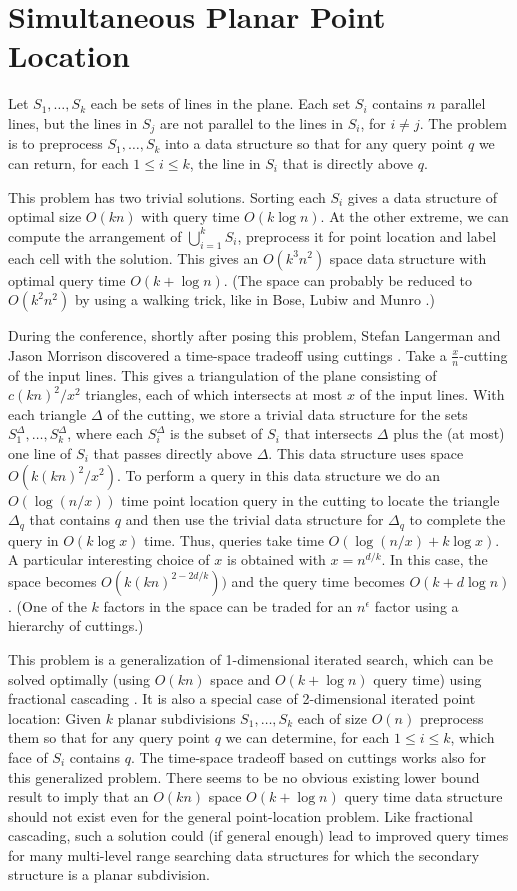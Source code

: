 \documentclass{article}
\newcommand{\problem}[1]{\section*{#1}}
\begin{document}
\problem{Simultaneous Planar Point Location}

Let $S_1,\ldots,S_k$ each be sets of lines in the plane.  Each set
$S_i$ contains $n$ parallel lines, but the lines in $S_j$ are not
parallel to the lines in $S_i$, for $i\neq j$.  The problem is to
preprocess $S_1,\ldots,S_k$ into a data structure so that for any
query point $q$ we can return, for each $1\le i\le k$, the line in
$S_i$ that is directly above $q$. 

This problem has two trivial solutions.  Sorting each $S_i$ gives a
data structure of optimal size $O(kn)$ with query time $O(k\log n)$.
At the other extreme, we can compute the arrangement of
$\bigcup_{i=1}^k S_i$, preprocess it for point location and label each
cell with the solution.  This gives an $O(k^3n^2)$ space data
structure with optimal query time $O(k + \log n)$.  (The space can
probably be reduced to $O(k^2n^2)$ by using a walking trick, like in
Bose, Lubiw and Munro \cite{blm02}.)

During the conference, shortly after posing this problem, Stefan
Langerman and Jason Morrison discovered a time-space tradeoff using
cuttings \cite{m98}. Take a $\frac{x}{n}$-cutting of the input lines.
This gives a triangulation of the plane consisting of $c(kn)^2/x^2$
triangles, each of which intersects at most $x$ of the input lines.
With each triangle $\Delta$ of the cutting, we store a trivial data
structure for the sets $S_1^\Delta,\ldots,S_k^\Delta$, where each
$S_i^\Delta$ is the subset of $S_i$ that intersects $\Delta$ plus the
(at most) one line of $S_i$ that passes directly above $\Delta$.  This
data structure uses space $O(k(kn)^2/x^2)$.  To perform a query in
this data structure we do an $O(\log (n/x))$ time point location query in the cutting to
locate the triangle $\Delta_q$ that contains $q$ and then use the
trivial data structure for $\Delta_q$ to complete the query in
$O(k\log x)$ time.  Thus, queries take time $O(\log(n/x) + k\log
x)$.   A particular interesting choice of $x$ is obtained with
$x=n^{d/k}$.  In this case, the space becomes $O(k(kn)^{2-2d/k}))$ and
the query time becomes $O(k + d\log n)$.  (One of the $k$ factors in
the space can be traded for an $n^\epsilon$ factor using a hierarchy
of cuttings.) 

This problem is a generalization of 1-dimensional iterated search,
which can be solved optimally (using $O(kn)$ space and $O(k+\log n)$
query time) using fractional cascading \cite{cg86}.  It is also a
special case of 2-dimensional iterated point location: Given $k$
planar subdivisions $S_1,\ldots,S_k$ each of size $O(n)$ preprocess
them so that for any query point $q$ we can determine, for each $1\le
i\le k$, which face of $S_i$ contains $q$. The time-space tradeoff
based on cuttings works also for this generalized problem.  There
seems to be no obvious existing lower bound result to imply that an
$O(kn)$ space $O(k+\log n)$ query time data structure should not exist
even for the general point-location problem.  Like fractional
cascading, such a solution could (if general enough) lead to improved
query times for many multi-level range searching data structures for
which the secondary structure is a planar subdivision.
\end{document}

